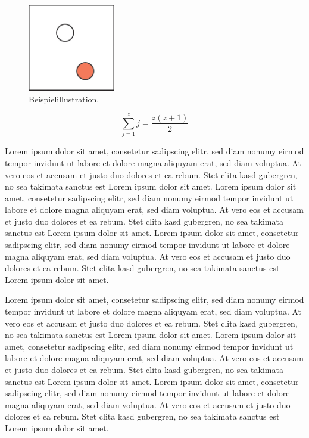 \documentclass[journal]{vgtc}
\begin{document}
\begin{figure}[tb]
  \centering
  \includegraphics[width=1.5in]{sample}
  \caption{\label{fig:sample} Beispielillustration.}
\end{figure}

\begin{equation}
  \sum_{j=1}^{z} j = \frac{z(z+1)}{2}
\end{equation}

Lorem ipsum dolor sit amet, consetetur sadipscing elitr, sed diam
nonumy eirmod tempor invidunt ut labore et dolore magna aliquyam erat,
sed diam voluptua. At vero eos et accusam et justo duo dolores et ea
rebum. Stet clita kasd gubergren, no sea takimata sanctus est Lorem
ipsum dolor sit amet. Lorem ipsum dolor sit amet, consetetur
sadipscing elitr, sed diam nonumy eirmod tempor invidunt ut labore et
dolore magna aliquyam erat, sed diam voluptua. At vero eos et accusam
et justo duo dolores et ea rebum. Stet clita kasd gubergren, no sea
takimata sanctus est Lorem ipsum dolor sit amet. Lorem ipsum dolor sit
amet, consetetur sadipscing elitr, sed diam nonumy eirmod tempor
invidunt ut labore et dolore magna aliquyam erat, sed diam
voluptua. At vero eos et accusam et justo duo dolores et ea
rebum. Stet clita kasd gubergren, no sea takimata sanctus est Lorem
ipsum dolor sit amet.

Lorem ipsum dolor sit amet, consetetur sadipscing elitr, sed diam
nonumy eirmod tempor invidunt ut labore et dolore magna aliquyam erat,
sed diam voluptua. At vero eos et accusam et justo duo dolores et ea
rebum. Stet clita kasd gubergren, no sea takimata sanctus est Lorem
ipsum dolor sit amet. Lorem ipsum dolor sit amet, consetetur
sadipscing elitr, sed diam nonumy eirmod tempor invidunt ut labore et
dolore magna aliquyam erat, sed diam voluptua. At vero eos et accusam
et justo duo dolores et ea rebum. Stet clita kasd gubergren, no sea
takimata sanctus est Lorem ipsum dolor sit amet. Lorem ipsum dolor sit
amet, consetetur sadipscing elitr, sed diam nonumy eirmod tempor
invidunt ut labore et dolore magna aliquyam erat, sed diam
voluptua. At vero eos et accusam et justo duo dolores et ea
rebum. Stet clita kasd gubergren, no sea takimata sanctus est Lorem
ipsum dolor sit amet.
\end{document}
